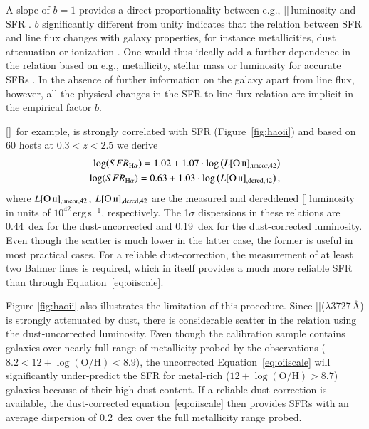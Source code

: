 \documentclass[traditabstract, longauth]{aa}
\newcommand{\oh}{12+\log(\mathrm{O/H})}
\newcommand{\oii}{[\ion{O}{ii}]}
\begin{document}
A slope of $b=1$ provides a direct proportionality between e.g., \oii\,luminosity and SFR \citep{1998ARA&A..36..189K, 2009ApJ...691..182S}. $b$ significantly different from unity indicates that the relation between SFR and line flux changes with galaxy properties, for instance metallicities, dust attenuation or ionization \citep[e.g.,][]{2004AJ....127.2002K}. One would thus ideally add a further dependence in the relation based on e.g., metallicity, stellar mass or luminosity for accurate SFRs \citep{2004AJ....127.2002K, 2010MNRAS.405.2594G}. In the absence of further information on the galaxy apart from line flux, however, all the physical changes in the SFR to line-flux relation are implicit in the empirical factor $b$.

\oii\, for example, is strongly correlated with SFR (Figure~\ref{fig:haoii}) and based on  {60 hosts at $0.3 < z < 2.5$} we derive
\begin{equation}
\label{eq:oiiscale}
\begin{split}
\log({SFR_{\rm{H}\alpha}}) = 1.02 + 1.07\cdot\log\left(L{\oii_{\rm{,uncor,42}}}\right)\\
\log({SFR_{\rm{H}\alpha}}) = 0.63 + 1.03\cdot\log\left(L{\oii_{\rm{,dered,42}}}\right),
\end{split}
\end{equation}
where $L{\oii_{\rm{,uncor,42}}}$, $L{\oii_{\rm{,dered,42}}}$ are the measured and dereddened \oii\,luminosity in units of $10^{42}$\,erg\,{s}$^{-1}$, respectively.  The 1$\sigma$ dispersions in these relations are 0.44~dex for the dust-uncorrected and 0.19~dex for the dust-corrected luminosity. Even though the scatter is much lower in the latter case, the former is useful in most practical cases. For a reliable dust-correction, the measurement of at least two Balmer lines is required, which in itself provides a much more reliable SFR than through Equation~\ref{eq:oiiscale}. 

 {Figure \ref{fig:haoii} also illustrates the limitation of this procedure. Since \oii($\lambda$3727\,\AA) is strongly attenuated by dust, there is considerable scatter in the relation using the dust-uncorrected luminosity. Even though the calibration sample contains galaxies over nearly full range of metallicity probed by the observations ($8.2 < \oh < 8.9$), the uncorrected Equation~\ref{eq:oiiscale} will significantly under-predict the SFR for metal-rich ($\oh > 8.7$) galaxies because of their high dust content. If a reliable dust-correction is available, the dust-corrected equation~\ref{eq:oiiscale} then provides SFRs with an average dispersion of 0.2~dex over the full metallicity range probed.}
\end{document}
